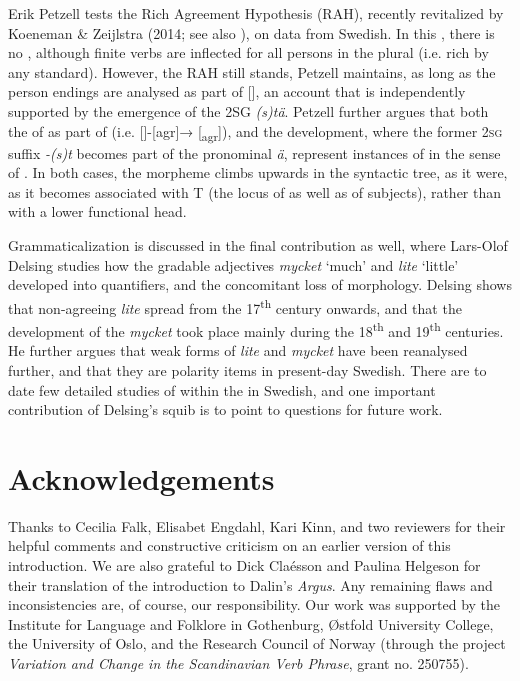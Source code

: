 \documentclass[output=paper]{langscibook}
\begin{document}
Erik Petzell tests the Rich Agreement Hypothesis (RAH), recently revitalized by Koeneman \& Zeijlstra (2014; see also \citealt{Tvica2017}), on data from  Swedish. In this , there is no  , although finite verbs are inflected for all persons in the plural (i.e. rich  by any standard). However, the RAH still stands, Petzell maintains, as long as the person endings are analysed as part of [], an account that is independently supported by the emergence of the 2SG  \textit{(s)tä}. Petzell further argues that both the  of  as part of  (i.e. []-[agr]→ [\textsubscript{agr}]), and the  development, where the former \textsc{2sg} suffix \textit{{}-(s)t} becomes part of the pronominal  \textit{ä}, represent instances of  in the sense of \citet{RobertsRoussou1999, RobertsRoussou2003}. In both cases, the  morpheme climbs upwards in the syntactic tree, as it were, as it becomes associated with T (the locus of  as well as of subjects), rather than with a lower functional head.



Grammaticalization is discussed in the final contribution as well, where Lars-Olof Delsing studies how the gradable adjectives \textit{mycket} ‘much’ and \textit{lite} ‘little’ developed into quantifiers, and the concomitant loss of  morphology. Delsing shows that non-agreeing \textit{lite} spread from the 17\textsuperscript{th} century onwards, and that the development of the  \textit{mycket} took place mainly during the 18\textsuperscript{th} and 19\textsuperscript{th} centuries. He further argues that weak forms of \textit{lite} and \textit{mycket} have been reanalysed further, and that they are polarity items in present-day Swedish. There are to date few detailed studies of  within the  in Swedish, and one important contribution of Delsing’s squib is to point to questions for future work.


\section*{Acknowledgements}


Thanks to Cecilia Falk, Elisabet Engdahl, Kari Kinn, and two reviewers for their helpful comments and constructive criticism on an earlier version of this introduction. We are also grateful to Dick Claésson and Paulina Helgeson for their translation of the introduction to Dalin’s \textit{Argus}. Any remaining flaws and inconsistencies are, of course, our responsibility. Our work was supported by the Institute for Language and Folklore in Gothenburg, Østfold University College, the University of Oslo, and the Research Council of Norway (through the project \textit{Variation and Change in the Scandinavian Verb Phrase}, grant no. 250755).
\end{document}
